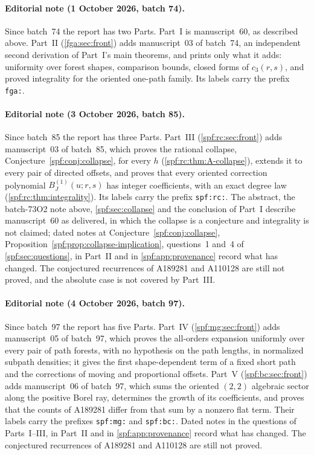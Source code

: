 \documentclass[11pt]{article}
\numberwithin{equation}{section}
\theoremstyle{definition}
\theoremstyle{remark}
\theoremstyle{definition}
\begin{document}
\paragraph{Editorial note (1 October 2026, batch 74).}
Since batch~74 the report has two Parts. Part~I is manuscript~60, as
described above. Part~II (\cref{fga:sec:front}) adds manuscript~03 of
batch~74, an independent second derivation of Part~I's main theorems, and
prints only what it adds: uniformity over forest shapes, comparison bounds,
closed forms of $c_3(r,s)$, and proved integrality for the oriented one-path
family. Its labels carry the prefix \texttt{fga:}.

\paragraph{Editorial note (3 October 2026, batch 85).}
Since batch~85 the report has three Parts. Part~III
(\cref{spf:rc:sec:front}) adds manuscript~03 of batch~85, which proves
the rational collapse, Conjecture~\ref{spf:conj:collapse}, for every $h$
(\cref{spf:rc:thm:A-collapse}), extends it to every pair of directed
offsets, and proves that every oriented correction polynomial
$B_J^{(1)}(u;r,s)$ has integer coefficients, with an exact degree law
(\cref{spf:rc:thm:integrality}). Its labels carry the prefix
\texttt{spf:rc:}. The abstract, the batch-73O2 note above,
\cref{spf:sec:collapse} and the conclusion of Part~I describe
manuscript~60 as delivered, in which the collapse is a conjecture and
integrality is not claimed; dated notes at
Conjecture~\ref{spf:conj:collapse},
Proposition~\ref{spf:prop:collapse-implication}, questions~1 and~4 of
\cref{spf:sec:questions}, in Part~II and in \cref{spf:app:provenance}
record what has changed. The conjectured recurrences of A189281 and
A110128 are still not proved, and the absolute case is not covered by
Part~III.

\paragraph{Editorial note (4 October 2026, batch 97).}
Since batch~97 the report has five Parts. Part~IV
(\cref{spf:mg:sec:front}) adds manuscript~05 of batch~97, which proves the
all-orders expansion uniformly over every pair of path forests, with no
hypothesis on the path lengths, in normalized subpath densities; it gives
the first shape-dependent term of a fixed short path and the corrections of
moving and proportional offsets. Part~V (\cref{spf:bc:sec:front}) adds
manuscript~06 of batch~97, which sums the oriented $(2,2)$ algebraic sector
along the positive Borel ray, determines the growth of its coefficients, and
proves that the counts of A189281 differ from that sum by a nonzero flat
term. Their labels carry the prefixes \texttt{spf:mg:} and \texttt{spf:bc:}.
Dated notes in the questions of Parts~I--III, in Part~II and in
\cref{spf:app:provenance} record what has changed. The conjectured
recurrences of A189281 and A110128 are still not proved.
\end{document}
